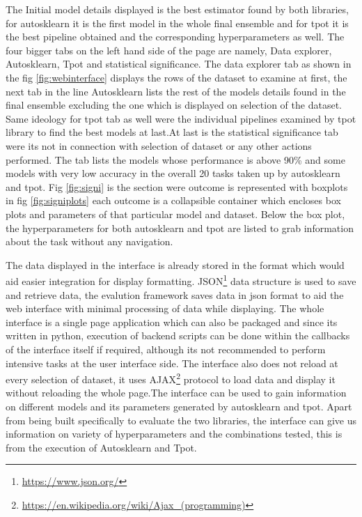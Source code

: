 The Initial model details displayed is the best estimator found by both libraries, for autosklearn it is the first model in the whole final ensemble and for tpot it is the best pipeline obtained and the corresponding hyperparameters as well. The four bigger tabs on the left hand side of the page are namely, Data explorer, Autosklearn, Tpot and statistical significance.
The data explorer tab as shown in the fig \ref{fig:webinterface} displays the rows of the dataset to examine at first, the next tab in the line Autosklearn lists the rest of the models details found in the final ensemble excluding the one which is displayed on selection of the dataset. Same ideology for tpot tab as well were the individual pipelines examined  by tpot library to find the best models at last.At last is the statistical significance tab were its not in connection with selection of dataset or any other actions performed. The tab lists the models whose performance is above 90\%  and some models with very low accuracy in the overall 20 tasks taken up by autosklearn and tpot. Fig \ref{fig:signi} is the section were outcome is represented with boxplots in fig \ref{fig:signiplots} each outcome is a collapsible container which encloses box plots and parameters of that particular model and dataset. Below the box plot, the hyperparameters for both autosklearn and tpot are listed to grab information about the task without any navigation.

The data displayed in the interface is already stored in the format which would aid easier integration for display formatting. JSON\footnote{\url{https://www.json.org/}} data structure is used to save and retrieve data, the evalution framework saves data in json format to aid the web interface with minimal processing of data while displaying. The whole interface is a single page application which can also be packaged and since its written in python, execution of backend scripts can be done within the callbacks of the interface itself if required, although its not recommended to perform intensive tasks at the user interface side. The interface also does not reload at every selection of dataset, it uses AJAX\footnote{\url{https://en.wikipedia.org/wiki/Ajax_(programming)}} protocol to load data and display it without reloading the whole page.The interface can be used to gain information on different models and its parameters generated by autosklearn and tpot. Apart from being built specifically to evaluate  the two libraries, the interface can give us information on variety of hyperparameters and the combinations tested, this is from the execution of Autosklearn and Tpot.

